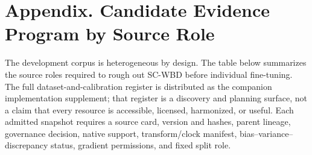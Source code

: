 \clearpage
\section{Appendix. Candidate Evidence Program by Source Role}

The development corpus is heterogeneous by design. The table below summarizes
the source roles required to rough out SC-WBD before individual fine-tuning.
The full dataset-and-calibration register is distributed as the companion
implementation supplement; that register is a discovery and planning surface,
not a claim that every resource is accessible, licensed, harmonized, or useful.
Each admitted snapshot requires a source card, version and hashes, parent
lineage, governance decision, native support, transform/clock manifest,
bias--variance--discrepancy status, gradient permissions, and fixed split role.

